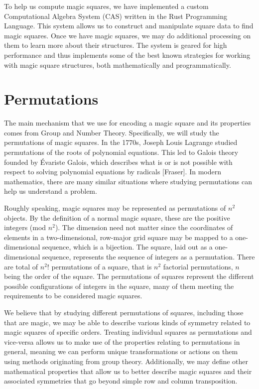 \documentclass[12pt]{report}
\begin{document}
\par To help us compute magic squares, we have implemented a custom Computational Algebra System
(CAS) written in the Rust Programming Language. This system allows us to construct and manipulate
square data to find magic squares. Once we have magic squares, we may do additional processing on
them to learn more about their structures. The system is geared for high performance and thus
implements some of the best known strategies for working with magic square structures, both
mathematically and programmatically.

\section{Permutations}

\par The main mechanism that we use for encoding a magic square and its properties comes from Group
and Number Theory. Specifically, we will study the permutations of magic squares. In the 1770s,
Joseph Louis Lagrange studied permutations of the roots of polynomial equations. This led to Galois
theory founded by Évariste Galois, which describes what is or is not possible with respect to
solving polynomial equations by radicals [Fraser]. In modern mathematics, there are many similar
situations where studying permutations can help us understand a problem.

\par Roughly speaking, magic squares may be represented as permutations of $n^2$ objects. By the
definition of a normal magic square, these are the positive integers (mod $n^2$). The dimension
need not matter since the coordinates of elements in a two-dimensional, row-major grid square may
be mapped to a one-dimensional sequence, which is a bijection. The square, laid out as a
one-dimensional sequence, represents the sequence of integers as a permutation. There are total of
$n^{2}$! permutations of a square, that is $n^2$ factorial permutations, $n$ being the order of the
square. The permutations of squares represent the different possible configurations of integers in
the square, many of them meeting the requirements to be considered magic squares.

\par We believe that by studying different permutations of squares, including those that are magic,
we may be able to describe various kinds of symmetry related to magic squares of specific orders.
Treating individual squares as permutations and vice-versa allows us to make use of the properties
relating to permutations in general, meaning we can perform unique transformations or actions on
them using methods originating from group theory. Additionally, we may define other mathematical
properties that allow us to better describe magic squares and their associated symmetries that go
beyond simple row and column transposition.
\end{document}
